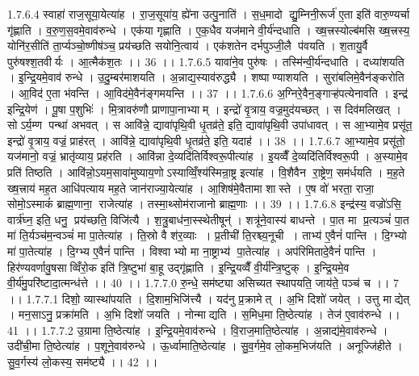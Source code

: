 1.7.6.4
स्वाहा॑ राज॒सूया॒येत्या॑ह । रा॒ज॒सूया॑य॒ ह्ये॑ना उत्पु॒नाति॑ । स॒ध॒मादो द्यु॒म्निनी॒रूर्ज॑ ए॒ता इति॑ वारु॒ण्यर्चा गृ॑ह्णाति । व॒रु॒ण॒स॒वमे॒वाव॑रुन्धे । एक॑या गृह्णाति । ए॒क॒धैव यज॑माने वी॒र्य॑न्दधाति । ख्ष॒त्त्रस्योल्ब॑मसि ख्ष॒त्त्रस्य॒ योनि॑र॒सीति॑ ता॒र्प्यञ्चो॒ष्णीष॑ञ्च॒ प्रय॑च्छति सयोनि॒त्वाय॑ । एक॑शतेन दर्भपुञ्जी॒लै प॑वयति । श॒तायु॒र्वै पुरु॑षश्श॒तवीर्यः । आ॒त्मैक॑श॒तः ।। 36 ।।
1.7.6.5
यावा॑ने॒व पुरु॑षः । तस्मि॑न्वी॒र्य॑न्दधाति । दध्या॑शयति । इ॒न्द्रि॒यमे॒वाव॑ रुन्धे । उ॒दु॒म्बर॑माशयति । अ॒न्नाद्य॒स्याव॑रुद्ध्यै । शष्पाण्याशयति । सुरा॑बलिमे॒वैन॑ङ्करोति । आ॒विद॑ ए॒ता भ॑वन्ति । आ॒विद॑मे॒वैन॑ङ्गमयन्ति ।। 37 ।।
1.7.6.6
अ॒ग्निरे॒वैन॒ङ्गाऱ्ह॑पत्येनावति । इन्द्र॑ इन्द्रि॒येण॑ । पू॒षा प॒शुभिः॑ । मि॒त्रावरु॑णौ प्राणापा॒नाभ्याम् । इन्द्रो॑ वृ॒त्राय॒ वज्र॒मुद॑यच्छत् । स दिव॑मलिखत् । सोऽर्य॒म्ण पन्था॑ अभवत् । स आवि॑न्ने॒ द्यावा॑पृथि॒वी धृ॒तव्र॑ते॒ इति॒ द्यावा॑पृथि॒वी उपा॑धावत् । स आ॒भ्यामे॒व प्रसू॑त॒ इन्द्रो॑ वृ॒त्राय॒ वज्रं॒ प्राह॑रत् । आवि॑न्ने॒ द्यावा॑पृथि॒वी धृ॒तव्र॑ते॒ इति॒ यदाह॑ ।। 38 ।।
1.7.6.7
आ॒भ्यामे॒व प्रसू॑तो॒ यज॑मानो॒ वज्रं॒ भ्रातृ॑व्याय॒ प्रह॑रति । आवि॑न्ना दे॒व्यदि॑तिर्विश्वरू॒पीत्या॑ह । इ॒यव्वैँ दे॒व्यदि॑तिर्विश्वरू॒पी । अ॒स्यामे॒व प्रति॑ तिष्ठति । आवि॑न्नो॒ऽयम॒सावा॑मुष्याय॒णोऽस्याव्विँ॒श्य॑स्मिन्रा॒ष्ट्र इत्या॑ह । वि॒शैवैन॑ रा॒ष्ट्रेण॒ सम॑र्धयति । म॒ह॒ते ख्ष॒त्त्राय॑ मह॒त आधि॑पत्याय मह॒ते जान॑राज्या॒येत्या॑ह । आ॒शिष॑मे॒वैतामा शास्ते । ए॒ष वो॑ भरता॒ राजा॒ सोमो॒ऽस्माकं॑ ब्राह्म॒णाना॒॒ राजेत्या॑ह । तस्मा॒थ्सोम॑राजानो ब्राह्म॒णाः ।। 39 ।।
1.7.6.8
इन्द्र॑स्य॒ वज्रो॑ऽसि॒ वार्त्र॑घ्न॒ इति॒ धनु॒ प्रय॑च्छति॒ विजि॑त्यै । श॒त्रु॒बाध॑ना॒स्स्थेतीषून्॑ । शत्रू॑ने॒वास्य॑ बाधन्ते । पा॒त मा प्र॒त्यञ्चं॑ पा॒त मा॑ ति॒र्यञ्च॑म॒न्वञ्चं॑ मा पा॒तेत्या॑ह । ति॒स्रो वै श॑र॒व्याः । प्र॒तीची॑ ति॒रश्च्य॒नूची । ताभ्य॑ ए॒वैनं॑ पान्ति । दि॒ग्भ्यो मा॑ पा॒तेत्या॑ह । दि॒ग्भ्य ए॒वैनं॑ पान्ति । विश्वाभ्यो मा ना॒ष्ट्राभ्य॑ पा॒तेत्या॑ह । अप॑रिमितादे॒वैनं॑ पान्ति । हिर॑ण्यवर्णावु॒षसाव्विँरो॒क इति॑ त्रि॒ष्टुभा॑ बा॒हू उद्गृ॑ह्णाति । इ॒न्द्रि॒यव्वैँ वी॒र्य॑न्त्रि॒ष्टुक् । इ॒न्द्रि॒यमे॒व वी॒र्य॑मु॒परि॑ष्टादा॒त्मन्ध॑त्ते ।। 40 ।।
1.7.7.0
रु॒न्धे॒ सम॑ष्ट्या असिच्यत स्थापयति॒ जाय॑ते॒ पञ्च॑ च ।। 7 ।।
1.7.7.1
दिशो॒ व्यास्था॑पयति । दि॒शाम॒भिजि॑त्त्यै । यद॑नु प्र॒क्रामेत् । अ॒भि दिशो॑ जयेत् । उत्तु माद्येत् । मन॒साऽनु॒ प्रक्रा॑मति । अ॒भि दिशो॑ जयति । नोन्माद्यति । स॒मिध॒मा ति॒ष्ठेत्या॑ह । तेज॑ ए॒वाव॑रुन्धे ।। 41 ।।
1.7.7.2
उ॒ग्रामा ति॒ष्ठेत्या॑ह । इ॒न्द्रि॒यमे॒वाव॑रुन्धे । वि॒राज॒माति॒ष्ठेत्या॑ह । अ॒न्नाद्य॑मे॒वाव॑रुन्धे । उदी॑ची॒मा ति॒ष्ठेत्या॑ह । प॒शूने॒वाव॑रुन्धे । ऊ॒र्ध्वामाति॒ष्ठेत्या॑ह । सु॒व॒र्गमे॒व लो॒कम॒भिज॑यति । अनूज्जि॑हीते । सु॒व॒र्गस्य॑ लो॒कस्य॒ सम॑ष्ट्यै ।। 42 ।।
